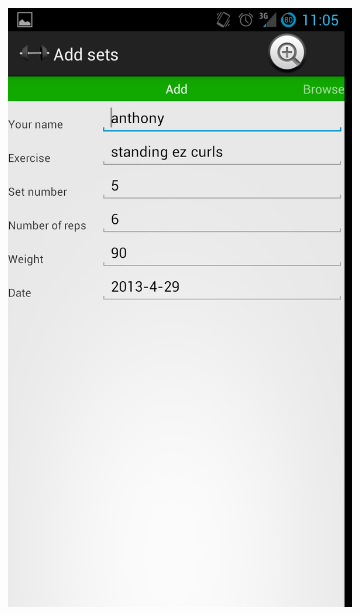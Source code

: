 \documentclass[]{beamer}
\begin{document}
\begin{frame}
\begin{figure}
    ~ %
    \begin{subfigure}[b]{0.3\textwidth}
        \centering
        \includegraphics[width=\textwidth]{images/ss2.png}
    \end{subfigure}
    ~ %
    \begin{subfigure}[b]{0.3\textwidth}

\end{subfigure}
\end{figure}
\end{frame}
\end{document}
